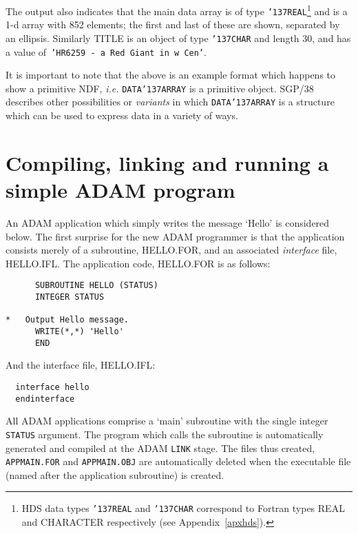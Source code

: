 \documentclass[twoside,11pt]{article}
\renewcommand{\_}{{\tt\char'137}}
\newcommand{\xref}[3]{#1}
\newcommand{\xlabel}[1]{}
\begin{document}
The output also indicates that the main data array is of type
{\tt\_REAL}\footnote{HDS data types {\tt\_REAL} and {\tt\_CHAR} correspond to Fortran types REAL
and CHARACTER respectively (see Appendix~\ref{apxhds}).}
and is a 1-d array with 852 elements;
the first and last of these are shown, separated by an ellipsis.
Similarly  TITLE is an object of type {\tt\_CHAR} and length
30, and has a value of\ {\tt 'HR6259 - a Red Giant in w Cen'}.

It is important to note that the above  is an example format which
happens to show a primitive NDF,
{\it i.e.} {\tt DATA\_ARRAY} is a primitive object.
\xref{SGP/38}{sgp38}{} describes other possibilities or {\sl variants\/} in
which {\tt DATA\_ARRAY} is a structure which  can be used to express
data in a variety of ways.


\newpage
\section{Compiling, linking and running a simple ADAM program\label{comp}\xlabel{compiling}}

An ADAM application which simply writes the message {`Hello'}
is considered below.
The first surprise for the new ADAM programmer is that the application
consists merely of a subroutine, HELLO.FOR, and an
associated {\sl interface\/} file, HELLO.IFL.
The application code, HELLO.FOR is as follows:
\begin{verbatim}
      SUBROUTINE HELLO (STATUS)
      INTEGER STATUS

*   Output Hello message.
      WRITE(*,*) 'Hello'
      END
\end{verbatim}
And the  interface file, HELLO.IFL:
\begin{verbatim}
  interface hello
  endinterface
\end{verbatim}
All ADAM applications comprise a `main' subroutine with the single
integer {\tt STATUS} argument.
The program which calls the subroutine is automatically
generated and compiled at the ADAM {\tt LINK} stage.
The files thus created, {\tt APPMAIN.FOR} and {\tt APPMAIN.OBJ}
are automatically deleted when the executable file (named after the
application subroutine) is created.
\end{document}

